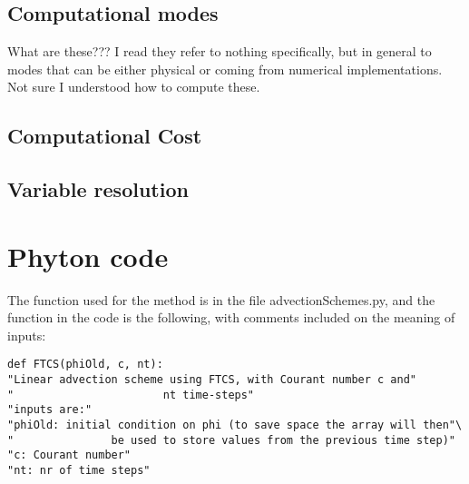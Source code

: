 \subsection{Computational modes}
What are these??? I read they refer to nothing specifically, but in general to modes that can be either physical or coming from numerical implementations. Not sure I understood how to compute these.

\subsection{Computational Cost}

\subsection{Variable resolution}


\section{Phyton code}
The function used for the method is in the file advectionSchemes.py, and the function in the code is the following, with comments included on the meaning of inputs:
\begin{lstlisting}
def FTCS(phiOld, c, nt):    
"Linear advection scheme using FTCS, with Courant number c and"
"                       nt time-steps"
"inputs are:"
"phiOld: initial condition on phi (to save space the array will then"\
"               be used to store values from the previous time step)"
"c: Courant number"
"nt: nr of time steps"
\end{lstlisting}



